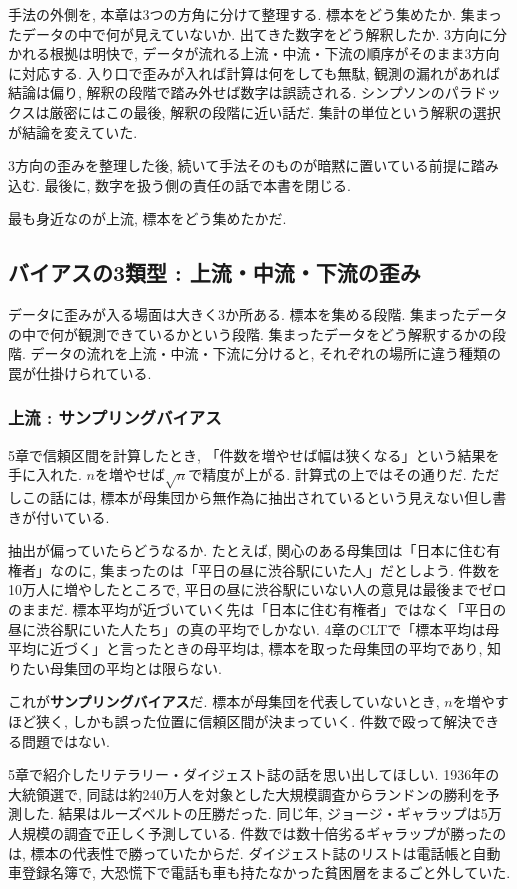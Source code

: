 手法の外側を, 本章は3つの方角に分けて整理する.
標本をどう集めたか. 集まったデータの中で何が見えていないか. 出てきた数字をどう解釈したか.
3方向に分かれる根拠は明快で, データが流れる上流・中流・下流の順序がそのまま3方向に対応する.
入り口で歪みが入れば計算は何をしても無駄, 観測の漏れがあれば結論は偏り, 解釈の段階で踏み外せば数字は誤読される.
シンプソンのパラドックスは厳密にはこの最後, 解釈の段階に近い話だ. 集計の単位という解釈の選択が結論を変えていた.

3方向の歪みを整理した後, 続いて手法そのものが暗黙に置いている前提に踏み込む.
最後に, 数字を扱う側の責任の話で本書を閉じる.

最も身近なのが上流, 標本をどう集めたかだ.


\subsection{バイアスの3類型 : 上流・中流・下流の歪み}

データに歪みが入る場面は大きく3か所ある.
標本を集める段階. 集まったデータの中で何が観測できているかという段階. 集まったデータをどう解釈するかの段階.
データの流れを上流・中流・下流に分けると, それぞれの場所に違う種類の罠が仕掛けられている.

\subsubsection*{上流 : サンプリングバイアス}

5章で信頼区間を計算したとき, 「件数を増やせば幅は狭くなる」という結果を手に入れた.
$n$を増やせば$\sqrt{n}$で精度が上がる. 計算式の上ではその通りだ.
ただしこの話には, 標本が母集団から無作為に抽出されているという見えない但し書きが付いている.

抽出が偏っていたらどうなるか.
たとえば, 関心のある母集団は「日本に住む有権者」なのに, 集まったのは「平日の昼に渋谷駅にいた人」だとしよう.
件数を10万人に増やしたところで, 平日の昼に渋谷駅にいない人の意見は最後までゼロのままだ.
標本平均が近づいていく先は「日本に住む有権者」ではなく「平日の昼に渋谷駅にいた人たち」の真の平均でしかない.
4章のCLTで「標本平均は母平均に近づく」と言ったときの母平均は, 標本を取った母集団の平均であり, 知りたい母集団の平均とは限らない.

これが\textbf{サンプリングバイアス}だ.
標本が母集団を代表していないとき, $n$を増やすほど狭く, しかも誤った位置に信頼区間が決まっていく.
件数で殴って解決できる問題ではない.

5章で紹介したリテラリー・ダイジェスト誌の話を思い出してほしい.
1936年の大統領選で, 同誌は約240万人を対象とした大規模調査からランドンの勝利を予測した.
結果はルーズベルトの圧勝だった. 同じ年, ジョージ・ギャラップは5万人規模の調査で正しく予測している.
件数では数十倍劣るギャラップが勝ったのは, 標本の代表性で勝っていたからだ.
ダイジェスト誌のリストは電話帳と自動車登録名簿で, 大恐慌下で電話も車も持たなかった貧困層をまるごと外していた.

